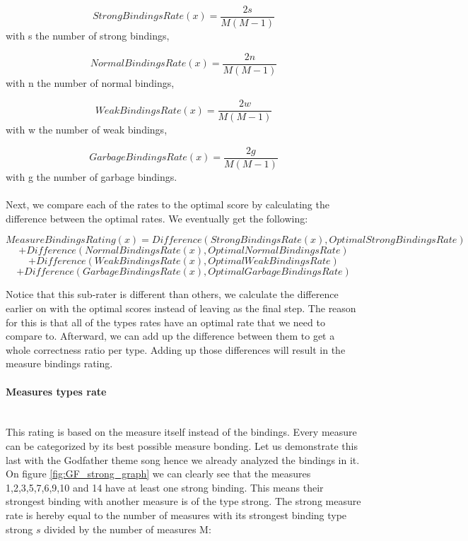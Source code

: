 \documentclass[a4paper]{article}
\begin{document}
\[ StrongBindingsRate(x) = \frac{\textit{2s}}{M  (M-1)} \]
with s the number of strong bindings,

\[ NormalBindingsRate(x) = \frac{\textit{2n}}{M  (M-1)} \]
with n the number of normal bindings,

\[ WeakBindingsRate(x) = \frac{\textit{2w}}{M (M-1)}   \]
with w the number of weak bindings,

\[ GarbageBindingsRate(x) = \frac{\textit{2g}}{M (M-1)} \]
with g the number of garbage bindings.
\\\\
Next, we compare each of the rates to the optimal score by calculating the difference between the optimal rates. We eventually get the following:

\[MeasureBindingsRating(x) = Difference( StrongBindingsRate(x) , OptimalStrongBindingsRate) \]
\[+ Difference( NormalBindingsRate(x) , OptimalNormalBindingsRate) \]
\[+ Difference( WeakBindingsRate(x) , OptimalWeakBindingsRate) \]
\[+ Difference( GarbageBindingsRate(x) , OptimalGarbageBindingsRate) \]
 

Notice that this sub-rater is different than others, we calculate the difference earlier on with the optimal scores instead of leaving as the final step. The reason for this is that all of the types rates have an optimal rate that we need to compare to. Afterward, we can add up the difference between them to get a whole correctness ratio per type. Adding up those differences will result in the measure bindings rating.

\paragraph{Measures types rate}\mbox{}\\ \label{sec:measure_type}
This rating is based on the measure itself instead of the bindings. Every measure can be categorized by its best possible measure bonding. Let us demonstrate this last with the Godfather theme song hence we already analyzed the bindings in it. On figure \ref{fig:GF_strong_graph} we can clearly see that the measures 1,2,3,5,7,6,9,10 and 14 have at least one strong binding. This means their strongest binding with another measure is of the type strong. 
The strong measure rate is hereby equal to the number of measures with its strongest binding type strong $s$ divided by the number of measures M:
\end{document}
